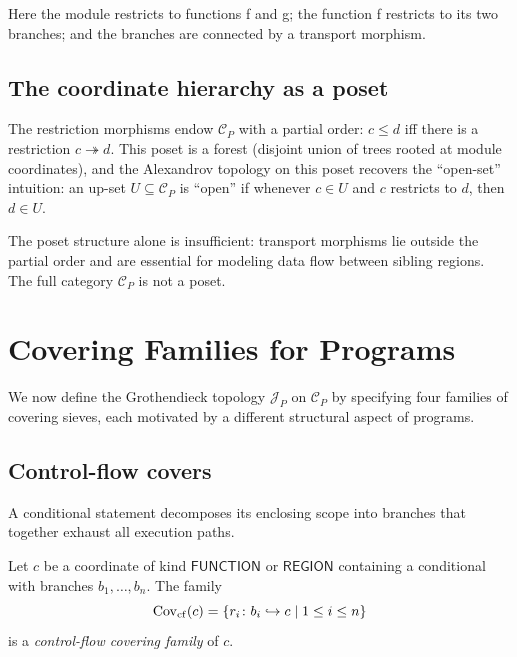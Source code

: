 \documentclass[11pt]{article}
\begin{document}
Here the module restricts to functions \textsf{f} and \textsf{g}; the function
\textsf{f} restricts to its two branches; and the branches are connected by a
transport morphism.

\subsection{The coordinate hierarchy as a poset}

The restriction morphisms endow $\mathcal{C}_P$ with a partial order: $c \leq d$
iff there is a restriction $c \twoheadrightarrow d$.  This poset is a forest
(disjoint union of trees rooted at module coordinates), and the Alexandrov
topology on this poset recovers the ``open-set'' intuition: an up-set
$U \subseteq \mathcal{C}_P$ is ``open'' if whenever $c \in U$ and $c$ restricts
to $d$, then $d \in U$.

\begin{remark}
The poset structure alone is insufficient: transport morphisms lie outside the
partial order and are essential for modeling data flow between sibling regions.
The full category $\mathcal{C}_P$ is not a poset.
\end{remark}

\section{Covering Families for Programs}\label{sec:covers}

We now define the Grothendieck topology $\mathscr{J}_P$ on $\mathcal{C}_P$ by
specifying four families of covering sieves, each motivated by a different
structural aspect of programs.

\subsection{Control-flow covers}

A conditional statement decomposes its enclosing scope into branches that
together exhaust all execution paths.

\begin{definition}\label{def:cf-cover}
Let $c$ be a coordinate of kind $\mathsf{FUNCTION}$ or $\mathsf{REGION}$
containing a conditional with branches $b_1, \ldots, b_n$.  The family
\[
  \mathrm{Cov}_{\mathrm{cf}}(c) = \{r_i \colon b_i \hookrightarrow c \mid 1 \leq i \leq n\}
\]
is a \emph{control-flow covering family} of $c$.
\end{definition}
\end{document}

